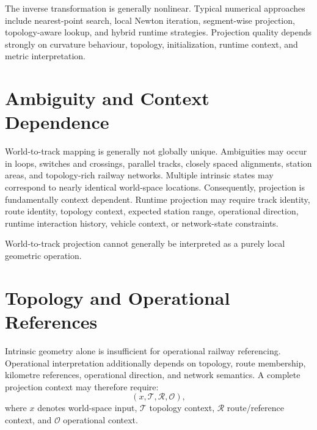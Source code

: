 The inverse transformation is generally nonlinear. Typical numerical
approaches include nearest-point search, local Newton iteration,
segment-wise projection, topology-aware lookup, and hybrid runtime
strategies. Projection quality depends strongly on curvature behaviour,
topology, initialization, runtime context, and metric interpretation.

\section{Ambiguity and Context Dependence}


World-to-track mapping is generally not globally unique. Ambiguities may
occur in loops, switches and crossings, parallel tracks, closely spaced
alignments, station areas, and topology-rich railway networks. Multiple
intrinsic states may correspond to nearly identical world-space
locations. Consequently, projection is fundamentally context dependent.
Runtime projection may require track identity, route identity, topology
context, expected station range, operational direction, runtime
interaction history, vehicle context, or network-state constraints.

\begin{principle}
\label{princ:projection-ambiguity}
World-to-track projection cannot generally be interpreted as a purely
local geometric operation.
\end{principle}

\section{Topology and Operational References}

Intrinsic geometry alone is insufficient for operational railway
referencing. Operational interpretation additionally depends on
topology, route membership, kilometre references, operational
direction, and network semantics. A complete projection context may
therefore require:
\[
(
x,
\mathcal T,
\mathcal R,
\mathcal O
),
\]
where \(x\) denotes world-space input, \(\mathcal T\) topology context,
\(\mathcal R\) route/reference context, and \(\mathcal O\)
operational context.

